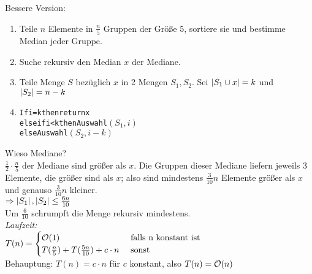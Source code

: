         Bessere Version:
        \begin{enumerate}
            \item Teile $n$ Elemente in $\frac{n}{5}$ Gruppen der Größe $5$, sortiere sie und bestimme Median jeder Gruppe.
            \item Suche rekursiv den Median $x$ der Mediane.
            \item Teile Menge $S$ bezüglich $x$ in 2 Mengen $S_1, S_2$. Sei $\left| S_1 \cup x \right| = k$ und $\left| S_2 \right| = n-k$
            \item 
            \begin{alltt} 
                If i = k then return x 
                else if i < k then Auswahl \( (S_1, i) \)
                else Auswahl \( (S_2, i-k) \)
            \end{alltt}
        \end{enumerate}
        Wieso Mediane? \\
        $\frac{1}{2} \cdot \frac{n}{5}$ der Mediane sind größer als $x$. Die Gruppen dieser Mediane liefern jeweils $3$ Elemente, die größer sind als $x$; also sind 
        mindestens $\frac{3}{10} n $ Elemente größer als $x$ und genauso $\frac{3}{10}n$ kleiner. \\
        $\Ra \btl S_1 \btr, \btl S_2 \btr \leq \frac{6n}{10}$ \\
        Um $\frac{6}{10}$ schrumpft die Menge rekursiv mindestens. \\
        \emph{Laufzeit:} \\
        $T(n) = \begin{cases} 
        \mathcal{O}(1) & \text{ falls n konstant ist} \\
        T(\frac{n}{5}) + T(\frac{5n}{10}) + c \cdot n & \text{ sonst}
        \end{cases}$ \\
        Behauptung: $T(n)  = c \cdot n$ für $c$ konstant, also $T(n) = \mathcal{O}(n)$ \\    

%
